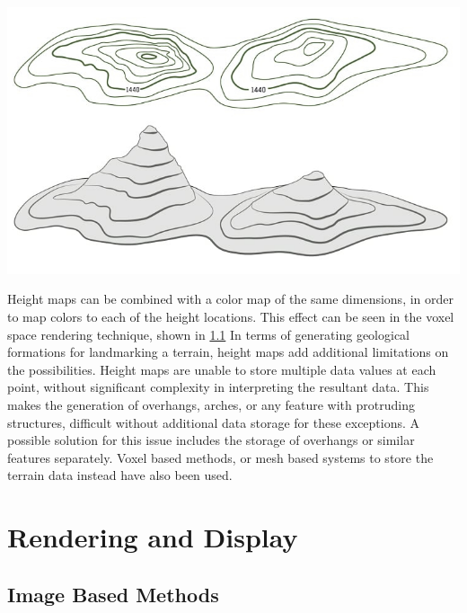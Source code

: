 \documentclass[10pt]{report}
\begin{document}
		\begin{minipage}{\textwidth}
			\centering
			\includegraphics[scale=.5]{top-map}
			\label{fig:top-map}
		\end{minipage} 
	
		Height maps can be combined with a color map of the same dimensions, in order to map colors to each of the height locations. This effect can be seen in the voxel space rendering technique, shown in \ref{sec:imagebasedmethods} In terms of generating geological formations for landmarking a terrain, height maps add additional limitations on the possibilities. Height maps are unable to store multiple data values at each point, without significant complexity in interpreting the resultant data. This makes the generation of overhangs, arches, or any feature with protruding structures, difficult without additional data storage for these exceptions. A possible solution for this issue includes the storage of overhangs or similar features separately. Voxel based methods, or mesh based systems to store the terrain data instead have also been used.  
		
	\vspace{10pt}
	\let\clearpage\relax
	\chapter{Rendering and Display}
	
		\section{Image Based Methods} \label{sec:imagebasedmethods}
		
\end{document}
